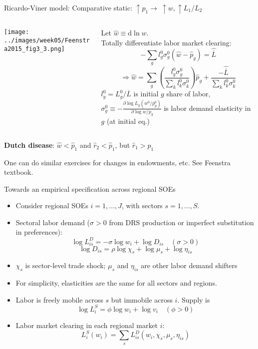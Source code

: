 \documentclass[11pt,notes=hide,aspectratio=169]{beamer}
\begin{document}
\begin{frame}{Ricardo-Viner model: Comparative static: $\uparrow p_1 \to \ \uparrow w, \uparrow L_1/L_2$}
\begin{columns}
\begin{column}{0.44\textwidth}
\texttt{[image: ../images/week05/Feenstra2015\_fig3\_3.png]}
\end{column}
\begin{column}{0.54\textwidth}\small
Let $\hat{w} \equiv \textrm{d} \ln w$.\\
Totally differentiate labor market clearing:\\
$$-\sum_{g}l_{g}^{0}\sigma_{g}^{0}(\hat{w}-\hat{p}_{g})=\hat{\overline{L}}$$
$$\Rightarrow\hat{w}=\sum_{g}\left(\frac{l_{g}^{0}\sigma_{g}^{0}}{\sum_{k}l_{k}^{0}\sigma_{k}^{0}}\right)\hat{p}_{g}+\frac{-\hat{\overline{L}}}{\sum_{k}l_{k}^{0}\sigma_{k}^{0}}$$
$l_{g}^{0}=L_{g}^{0}/\overline{L}$ is initial $g$ share of labor,
$\sigma_{g}^{0}\equiv-\frac{\partial \log L_{g}(w^{0}/p_{g}^{0})}{\partial \log w/p_{g}}$ is labor demand elasticity in $g$ (at initial eq.)
\end{column}
\end{columns}
\begin{itemize}{\small
    \item \textbf{Dutch disease}: $\hat{w}<\hat{p}_{1}$ and $\hat{r}_{2}<\hat{p}_{1}$, but $\hat{r}_{1}>\hat{p}_{1}$
}\end{itemize}
{\footnotesize One can do similar exercises for changes in endowments, etc. See Feenstra textbook.}
\end{frame}
\begin{frame}{Towards an empirical specification across regional SOEs}
    \begin{itemize}
        \item Consider regional SOEs $i=1,...,J$, with sectors $s=1,...,S$.
        \item Sectoral labor demand ($\sigma > 0$ from DRS production or imperfect substitution in preferences):
        $$ \log L_{is}^{D}=-\sigma \log w_{i}+\log D_{is} \quad (\sigma>0) $$
        $$ \log D_{is}=\rho \log \chi_{s}+\log \mu_{s}+\log \eta_{is}  $$
        \item $\chi_{s}$ is sector-level trade shock;
        $\mu_{s}$ and $\eta_{is}$ are other labor demand shifters
        \item For simplicity, elasticities are the same for all sectors and regions.
        \item Labor is freely mobile across $s$ but immobile across $i$. Supply is
        $$ \log L_{i}^{S}=\phi \log w_{i}+\log v_{i} \quad (\phi>0) $$
        \item Labor market clearing in each regional market $i$:
        $$ L_{i}^{S}(w_{i})=\sum_{s}L_{is}^{D}(w_{i},\chi_{s},\mu_{s},\eta_{is}) $$
    \end{itemize}
\end{frame}
\end{document}
